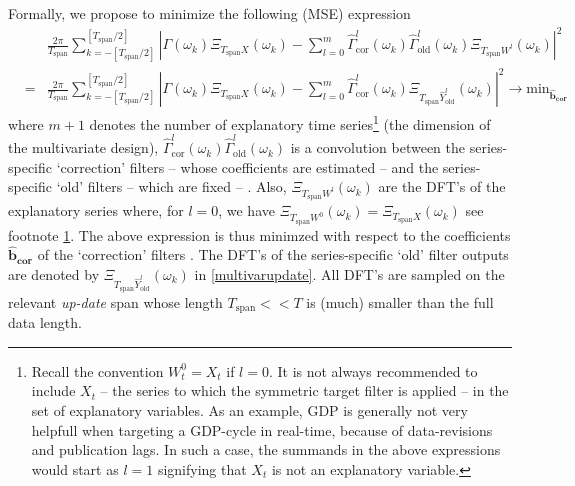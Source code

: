 \documentclass[11pt]{article}
\begin{document}
Formally, we propose to minimize the following (MSE) expression 
\begin{eqnarray}\label{multivarupdate}
&&\frac{2\pi}{T_{\textrm{span}}} \sum_{k=-[T_{\textrm{span}}/2]}^{[T_{\textrm{span}}/2]}
\left|\Gamma(\omega_k)\Xi_{T_{\textrm{span}}X}(\omega_k)-\sum_{l=0}^m\hat{\Gamma}_{\textrm{cor}}^l(\omega_k)\hat{\Gamma}_{\textrm{old}}^l(\omega_k)
\Xi_{T_{\textrm{span}}W^l}(\omega_k)\right|^2\nonumber\\
&=&\frac{2\pi}{T_{\textrm{span}}} \sum_{k=-[T_{\textrm{span}}/2]}^{[T_{\textrm{span}}/2]}
\left|\Gamma(\omega_k)\Xi_{T_{\textrm{span}}X}(\omega_k)-\sum_{l=0}^m\hat{\Gamma}_{\textrm{cor}}^l(\omega_k)
\Xi_{T_{\textrm{span}}\hat{Y}_{\textrm{old}}^l}(\omega_k)\right|^2\to \textrm{min}_{\mathbf{\hat{b}_{\textrm{cor}}}}
\end{eqnarray}
where $m+1$ denotes the number of explanatory time series\footnote{\label{w0x}Recall the convention $W_t^0=X_t$ if $l=0$. It is not always recommended to include $X_t$ -- the series to which the symmetric target filter is applied -- in the set of explanatory variables. As an example, GDP is generally not very helpfull when targeting a GDP-cycle in real-time, because of data-revisions and publication lags. In such a case, the summands in the above expressions would start as $l=1$ signifying that $X_t$ is not an explanatory variable.} (the dimension of the multivariate design), $\hat{\Gamma}_{\textrm{cor}}^l(\omega_k)\hat{\Gamma}_{\textrm{old}}^l(\omega_k)$ is a convolution between the  series-specific `correction' filters -- whose coefficients are estimated -- and the series-specific `old' filters -- which are fixed -- . Also, $\Xi_{T_{\textrm{span}}W^l}(\omega_k)$ are the DFT's of the explanatory series where, for $l=0$, we have $\Xi_{T_{\textrm{span}}W^0}(\omega_k)=\Xi_{T_{\textrm{span}}X}(\omega_k)$ see footnote \ref{w0x}. The above expression is thus minimzed with respect to the coefficients $\mathbf{\hat{b}_{\textrm{cor}}}$ of the `correction' filters . The DFT's of the series-specific `old' filter outputs are denoted by $\Xi_{T_{\textrm{span}}\hat{Y}_{\textrm{old}}^l}(\omega_k)$ in \ref{multivarupdate}. All DFT's are sampled on the relevant \emph{up-date} span whose  length $T_{\textrm{span}}<<T$ is (much) smaller than the full data length. \\
\end{document}
